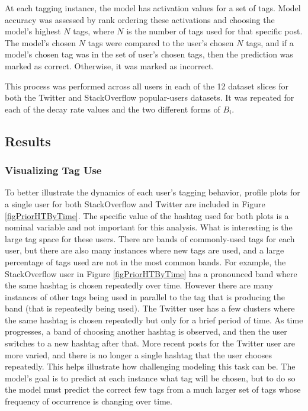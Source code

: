 \documentclass[man,floatsintext,donotrepeattitle]{apa6}
\begin{document}
At each tagging instance, the model has activation values for a set of tags.
Model accuracy was assessed by rank ordering these activations and choosing the model's highest $N$ tags, where $N$ is the number of tags used for that specific post.
The model's chosen $N$ tags were compared to the user's chosen $N$ tags, and if a model's chosen tag was in the set of user's chosen tags, then the prediction was marked as correct.
Otherwise, it was marked as incorrect.

This process was performed across all users in each of the 12 dataset slices for both the Twitter and StackOverflow popular-users datasets.
It was repeated for each of the decay rate values and the two different forms of $B_{i}$.

\subsection{Results}

\subsubsection{Visualizing Tag Use}

To better illustrate the dynamics of each user's tagging behavior,
profile plots for a single user for both StackOverflow and Twitter are included in Figure \ref{figPriorHTByTime}.
The specific value of the hashtag used for both plots is a nominal variable and not important for this analysis.
What is interesting is the large tag space for these users.
There are bands of commonly-used tags for each user, but there are also many instances where new tags are used, and a large percentage of tags used are not in the most common bands.
For example, the StackOverflow user in Figure \ref{figPriorHTByTime} has a pronounced band where the same hashtag is chosen repeatedly over time. 
However there are many instances of other tags being used in parallel to the tag that is producing the band (that is repeatedly being used). 
The Twitter user has a few clusters where the same hashtag is chosen repeatedly but only for a brief period of time.
As time progresses, a band of choosing another hashtag is observed, and then the user switches to a new hashtag after that.
More recent posts for the Twitter user are more varied, and there is no longer a single hashtag that the user chooses repeatedly.
This helps illustrate how challenging modeling this task can be.
The model's goal is to predict at each instance what tag will be chosen, but to do so the model must predict the correct few tags from a much larger set of tags whose frequency of occurrence is changing over time.
\end{document}
